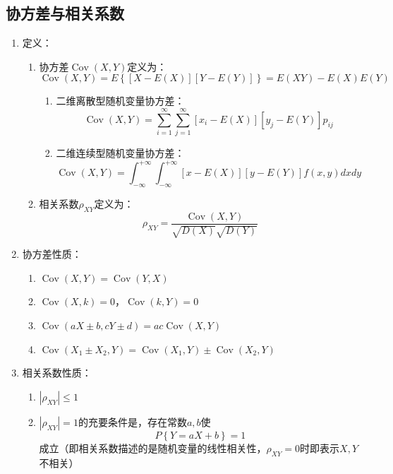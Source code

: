 \documentclass[12pt,a4paper,UTF8]{book}
\begin{document}
\subsection{协方差与相关系数}
\begin{enumerate}
\item 定义：
\begin{enumerate}
\item 协方差$\operatorname{Cov}\left(X,Y\right)$定义为：
\[\operatorname{Cov}\left(X,Y\right)=E\left\{\left[X-E\left(X\right)\right]\left[Y-E\left(Y\right)\right]\right\}=E\left(XY\right)-E\left(X\right)E\left(Y\right)\]
\begin{enumerate}
\item 二维离散型随机变量协方差：
\[\operatorname{Cov}\left(X,Y\right)=\sum\limits_{i=1}^{\infty}\sum\limits_{j=1}^{\infty}\left[x_i-E\left(X\right)\right]\left[y_j-E\left(Y\right)\right]p_{ij}\]
\item 二维连续型随机变量协方差：
\[\operatorname{Cov}\left(X,Y\right)=\int_{-\infty}^{+\infty}\int_{-\infty}^{+\infty}\left[x-E\left(X\right)\right]\left[y-E\left(Y\right)\right]f\left(x,y\right)dxdy\]
\end{enumerate}
\item 相关系数$\rho_{XY}$定义为：
\[\rho_{XY}=\frac{\operatorname{Cov}\left(X,Y\right)}{\sqrt{D\left(X\right)}\sqrt{D\left(Y\right)}}\]
\end{enumerate}
\item 协方差性质：
\begin{enumerate}
\item $\operatorname{Cov}\left(X,Y\right)=\operatorname{Cov}\left(Y,X\right)$
\item $\operatorname{Cov}\left(X,k\right)=0$，$\operatorname{Cov}\left(k,Y\right)=0$
\item $\operatorname{Cov}\left(aX\pm b,cY\pm d\right)=ac\operatorname{Cov}\left(X,Y\right)$
\item $\operatorname{Cov}\left(X_1\pm X_2,Y\right)=\operatorname{Cov}\left(X_1,Y\right)\pm\operatorname{Cov}\left(X_2,Y\right)$
\end{enumerate}
\item 相关系数性质：
\begin{enumerate}
\item $\left|\rho_{XY}\right|\leq1$
\item $\left|\rho_{XY}\right|=1$的充要条件是，存在常数$a,b$使
\[P\left\{Y=aX+b\right\}=1\]
成立（即相关系数描述的是随机变量的线性相关性，$\rho_{XY}=0$时即表示$X,Y$不相关）
\end{enumerate}
\end{enumerate}
\end{document}
